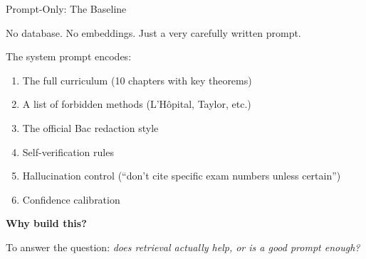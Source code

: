 \documentclass[aspectratio=169, 11pt]{beamer}
\begin{document}
\begin{frame}{Prompt-Only: The Baseline}

No database. No embeddings. Just a very carefully written prompt.

\bigskip

The system prompt encodes:
\begin{enumerate}
    \item The full curriculum (10 chapters with key theorems)
    \item A list of \alert{forbidden methods} (L'H\^opital, Taylor, etc.)
    \item The official Bac redaction style
    \item Self-verification rules
    \item Hallucination control (``don't cite specific exam numbers unless certain'')
    \item Confidence calibration
\end{enumerate}

\bigskip

\textbf{Why build this?}

To answer the question: \textit{does retrieval actually help, or is a good prompt enough?}

\end{frame}
\end{document}

